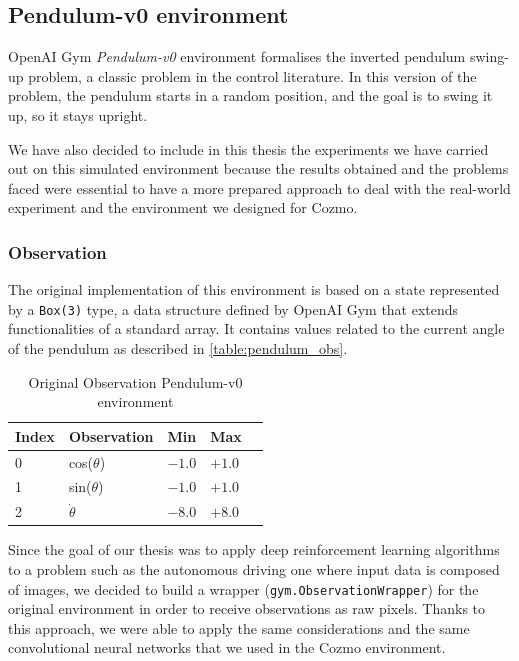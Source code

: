 \subsection{Pendulum-v0 environment}

OpenAI Gym \textit{Pendulum-v0} environment formalises the inverted pendulum swing-up problem, a classic problem in the control literature.
In this version of the problem, the pendulum starts in a random position, and the goal is to swing it up, so it stays upright.

We have also decided to include in this thesis the experiments we have carried out on this simulated environment because the results obtained and the problems faced were essential to have a more prepared approach to deal with the real-world experiment and the environment we designed for Cozmo.


\subsubsection{Observation}

The original implementation of this environment is based on a state represented by a \texttt{Box(3)} type, a data structure defined by OpenAI Gym that extends functionalities of a standard array.
It contains values related to the current angle of the pendulum as described in \vref{table:pendulum_obs}.

\begin{table}[!h]
	\centering
	\caption{Original Observation Pendulum-v0 environment}
	\label{table:pendulum_obs}
	\begin{tabular}{@{}lllll@{}}
		\toprule
		Index & Observation    & Min    & Max    \\ \midrule
		0     & cos($\theta$)  & $-1.0$ & $+1.0$ \\
		1     & sin($\theta$)  & $-1.0$ & $+1.0$ \\
		2     & $\dot{\theta}$ & $-8.0$ & $+8.0$ \\
		\bottomrule
	\end{tabular}
\end{table}

Since the goal of our thesis was to apply deep reinforcement learning algorithms to a problem such as the autonomous driving one where input data is composed of images, we decided to build a wrapper (\texttt{gym.ObservationWrapper}) for the original environment in order to receive observations as raw pixels.
Thanks to this approach, we were able to apply the same considerations and the same convolutional neural networks that we used in the Cozmo environment.

